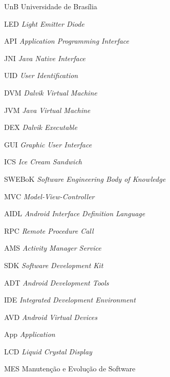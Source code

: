 \begin{siglas}
  \item[UnB] Universidade de Brasília
  \item[LED] \textit{Light Emitter Diode}
  \item[API] \textit{Application Programming Interface}
  \item[JNI] \textit{Java Native Interface}
  \item[UID] \textit{User Identification}
  \item[DVM] \textit{Dalvik Virtual Machine}
  \item[JVM] \textit{Java Virtual Machine}
  \item[DEX] \textit{Dalvik Executable}
  \item[GUI] \textit{Graphic User Interface}
  \item[ICS] \textit{Ice Cream Sandwich}
  \item[SWEBoK] \textit{Software Engineering Body of Knowledge}
  \item[MVC] \textit{Model-View-Controller}
  \item[AIDL] \textit{Android Interface Definition Language}
  \item[RPC] \textit{Remote Procedure Call}
  \item[AMS] \textit{Activity Manager Service}
  \item[SDK] \textit{Software Development Kit}
  \item[ADT] \textit{Android Development Tools}
  \item[IDE] \textit{Integrated Development Environment}
  \item[AVD] \textit{Android Virtual Devices} 
  \item[App] \textit{Application}
  \item[LCD] \textit{Liquid Crystal Display}
  \item[MES] Manutenção e Evolução de Software

\end{siglas}


